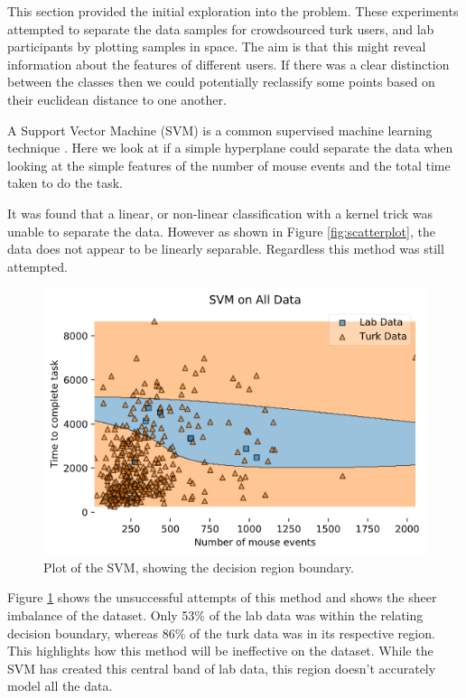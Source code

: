 \documentclass{article}
\begin{document}
This section provided the initial exploration into the problem.
These experiments attempted to separate the data samples for crowdsourced turk users, and lab participants by plotting samples in space.
The aim is that this might reveal information about the features of different users.
If there was a clear distinction between the classes then we could potentially reclassify some points based on their euclidean distance to one another.

A Support Vector Machine (SVM) is a common supervised machine learning technique \cite{noble2006support}.
Here we look at if a simple hyperplane could separate the data when looking at the simple features of the number of mouse events and the total time taken to do the task. 

It was found that a linear, or non-linear classification with a kernel trick was unable to separate the data.
However as shown in Figure \ref{fig:scatterplot}, the data does not appear to be linearly separable.
Regardless this method was still attempted.

\begin{figure}[ht]
    \centering
    \includegraphics[scale=0.6]{Images/SVM-Decision-Region-Boundary.png}
    \caption{Plot of the SVM, showing the decision region boundary.}
    \label{fig:SVM}
\end{figure}

Figure \ref{fig:SVM} shows the unsuccessful attempts of this method and shows the sheer imbalance of the dataset.
Only 53\% of the lab data was within the relating decision boundary, whereas 86\% of the turk data was in its respective region.
This highlights how this method will be ineffective on the dataset.
While the SVM has created this central band of lab data, this region doesn't accurately model all the data. 
\end{document}
